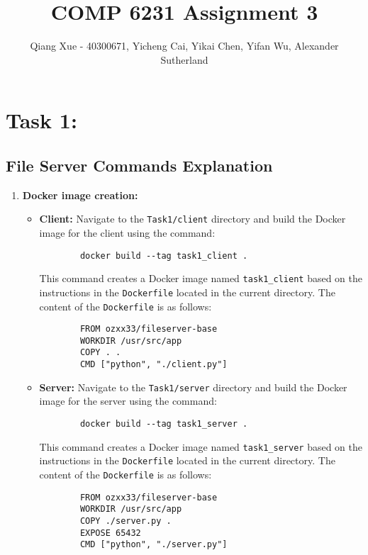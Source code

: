 \documentclass{article}
\title{COMP 6231 Assignment 3}
\author{Qiang Xue - 40300671, Yicheng Cai, Yikai Chen, Yifan Wu, Alexander Sutherland}
\begin{document}
\maketitle
\section*{Task 1: }
\subsection*{File Server Commands Explanation}
\begin{enumerate}
    \item \textbf{Docker image creation:} 
    \begin{itemize}
        \item \textbf{Client:} Navigate to the \texttt{Task1/client} directory and build the Docker image for the client using the command:
        \begin{verbatim}
        docker build --tag task1_client .
        \end{verbatim}
        This command creates a Docker image named \texttt{task1\_client} based on the instructions in the \texttt{Dockerfile} located in the current directory. The content of the \texttt{Dockerfile} is as follows:
        \begin{verbatim}
        FROM ozxx33/fileserver-base
        WORKDIR /usr/src/app
        COPY . .
        CMD ["python", "./client.py"]
        \end{verbatim}
        \item \textbf{Server:} Navigate to the \texttt{Task1/server} directory and build the Docker image for the server using the command:
        \begin{verbatim}
        docker build --tag task1_server .
        \end{verbatim}
        This command creates a Docker image named \texttt{task1\_server} based on the instructions in the \texttt{Dockerfile} located in the current directory. The content of the \texttt{Dockerfile} is as follows:
        \begin{verbatim}
        FROM ozxx33/fileserver-base
        WORKDIR /usr/src/app
        COPY ./server.py .
        EXPOSE 65432
        CMD ["python", "./server.py"]
        \end{verbatim}
    \end{itemize}
    

\end{enumerate}
\end{document}
